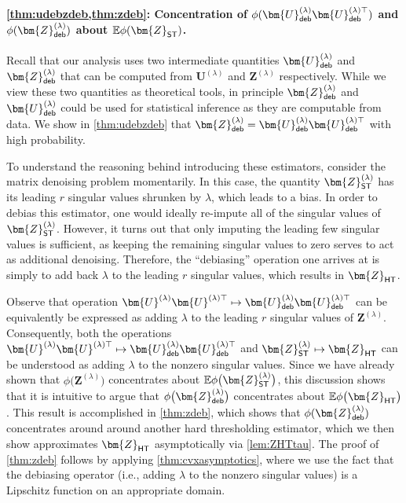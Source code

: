 \documentclass[10pt]{article}
\theoremstyle{definition}
\begin{document}
\paragraph{\cref{thm:udebzdeb,thm:zdeb}: Concentration of $\phi(\bm{U}^{(\lambda)}_{{\sf deb}} \bm{U}^{(\lambda)\top}_{{\sf deb}})$ and $\phi(\bm{Z}^{(\lambda)}_{{\sf deb}})$ about $\mathbb{E} \phi(\bm{Z}_{{\sf ST}})$.}  Recall that our analysis uses two intermediate quantities $\bm{U}^{(\lambda)}_{{\sf deb}}$ and $\bm{Z}_{{\sf deb}}^{(\lambda)}$    
    that can be computed from $\bm{U}^{(\lambda)}$ and $\bm{Z}^{(\lambda)}$ respectively.
While we view these two quantities as theoretical tools, in principle $\bm{Z}_{{\sf deb}}^{(\lambda)}$ and $\bm{U}_{{\sf deb}}^{(\lambda)}$ could be used for statistical inference as they are computable from data.   We show in \cref{thm:udebzdeb} that $\bm{Z}_{{\sf deb}}^{(\lambda)} = \bm{U}^{(\lambda)}_{{\sf deb}}\bm{U}^{(\lambda)\top}_{{\sf deb}}$ with high probability. 

To understand the reasoning behind introducing these estimators, consider the matrix denoising problem momentarily. In this case, the quantity $\bm{Z}_{{\sf ST}}^{(\lambda)}$ has its leading $r$ singular values shrunken by $\lambda$, which leads to a bias.  In order to debias this estimator, one would ideally re-impute all of the singular values of $\bm{Z}_{{\sf ST}}^{(\lambda)}$.  However, it turns out that only imputing the leading few singular values is sufficient, as keeping the remaining singular values to zero serves to act as additional denoising.  Therefore, the ``debiasing'' operation one arrives at is simply to add back $\lambda$ to the leading $r$ singular values, which results in $\bm{Z}_{{\sf HT}}$. 

Observe that operation $\bm{U}^{(\lambda)}\bm{U}^{(\lambda)\top} \mapsto \bm{U}_{{\sf deb}}^{(\lambda)}\bm{U}_{{\sf deb}}^{(\lambda)\top}$ can be equivalently be expressed as adding $\lambda$ to the leading $r$ singular values of $\bm{Z}^{(\lambda)}$. Consequently, both the operations $\bm{U}^{(\lambda)} \bm{U}^{(\lambda)\top} \mapsto \bm{U}^{(\lambda)}_{{\sf deb}} \bm{U}^{(\lambda)\top}_{{\sf deb}}$ and $\bm{Z}_{{\sf ST}}^{(\lambda)} \mapsto \bm{Z}_{{\sf HT}}$ can be understood as adding $\lambda$ to the nonzero singular values.  Since  we have already shown that $\phi\big(\bm{Z}^{(\lambda)}\big)$ concentrates about $\mathbb{E}\phi\big(\bm{Z}^{(\lambda)}_{{\sf ST}}\big)$, this discussion shows that it is intuitive to argue that $\phi\big(\bm{Z}_{{\sf deb}}^{(\lambda)}\big)$ concentrates about $\mathbb{E}\phi\big( \bm{Z}_{{\sf HT}}\big)$.   This result is accomplished in \cref{thm:zdeb}, which shows that $\phi(\bm{Z}_{{\sf deb}}^{(\lambda)})$ concentrates around around another hard thresholding estimator, which we then show approximates $\bm{Z}_{{\sf HT}}$ asymptotically via \cref{lem:ZHTtau}.  The proof of \cref{thm:zdeb} follows by applying \cref{thm:cvxasymptotics}, where we use the fact that the debiasing operator (i.e., adding $\lambda$ to the nonzero singular values) is a Lipschitz function on an appropriate domain.  
\end{document}
